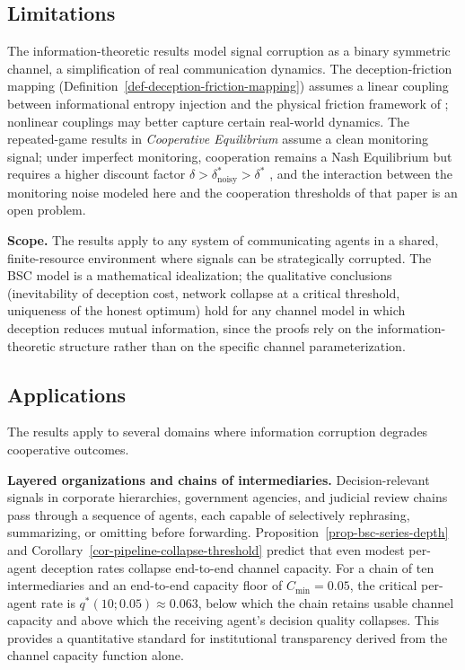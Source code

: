 \documentclass[11pt]{article}
\theoremstyle{plain}
\theoremstyle{definition}
\theoremstyle{remark}
\let\origsubsection\subsection
\renewcommand{\subsection}{\needspace{7\baselineskip}\origsubsection}
\begin{document}
\subsection{Limitations}\label{limitations}

The information-theoretic results model signal corruption as a binary
symmetric channel, a simplification of real communication dynamics. The
deception-friction mapping
(Definition~\ref{def-deception-friction-mapping}) assumes a linear
coupling between informational entropy injection and the physical
friction framework of \citep{TC-IV}; nonlinear couplings may better
capture certain real-world dynamics. The repeated-game results in
\emph{Cooperative Equilibrium} \citep{TC-V} assume a clean monitoring
signal; under imperfect monitoring, cooperation remains a Nash
Equilibrium but requires a higher discount factor
\(\delta > \delta^*_{\text{noisy}} > \delta^*\)
\citep{Fudenberg1994, GreenPorter1984}, and the interaction between the
monitoring noise modeled here and the cooperation thresholds of that
paper is an open problem.

\textbf{Scope.} The results apply to any system of communicating agents
in a shared, finite-resource environment where signals can be
strategically corrupted. The BSC model is a mathematical idealization;
the qualitative conclusions (inevitability of deception cost, network
collapse at a critical threshold, uniqueness of the honest optimum) hold
for any channel model in which deception reduces mutual information,
since the proofs rely on the information-theoretic structure rather than
on the specific channel parameterization.

\subsection{Applications}\label{applications}

The results apply to several domains where information corruption
degrades cooperative outcomes.

\textbf{Layered organizations and chains of intermediaries.}
Decision-relevant signals in corporate hierarchies, government agencies,
and judicial review chains pass through a sequence of agents, each
capable of selectively rephrasing, summarizing, or omitting before
forwarding. Proposition~\ref{prop-bsc-series-depth} and
Corollary~\ref{cor-pipeline-collapse-threshold} predict that even modest
per-agent deception rates collapse end-to-end channel capacity. For a
chain of ten intermediaries and an end-to-end capacity floor of
\(C_{\min} = 0.05\), the critical per-agent rate is
\(q^*(10; 0.05) \approx 0.063\), below which the chain retains usable
channel capacity and above which the receiving agent's decision quality
collapses. This provides a quantitative standard for institutional
transparency derived from the channel capacity function alone.
\end{document}
